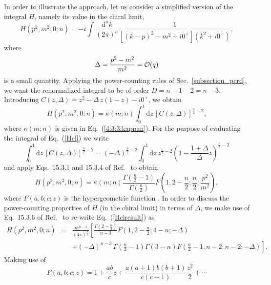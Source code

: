 \documentclass[twoside,12pt]{article}
\begin{document}
   In order to illustrate the approach, let us consider a simplified version
of the integral $H$, namely its value in the chiral limit,
\begin{displaymath}
H(p^2,m^2,0;n)= -i\int \frac{\mbox{d}^n k}{(2\pi)^n}
\frac{1}{[(k-p)^2-m^2+i0^+](k^2+i0^+)},
\end{displaymath}
where
\begin{displaymath}
\Delta=\frac{p^2-m^2}{m^2}={\cal O}(q)
\end{displaymath}
is a small quantity.
   Applying the power-counting rules of Sec.~\ref{subsection_pcrd},
we want the renormalized integral to be of order $D=n-1-2=n-3$.
Introducing
$C(z,\Delta)=z^2-\Delta\, z(1-z)-i0^+$,
we obtain
\begin{equation}
\label{Hcl}
H(p^2,m^2,0;n)=\kappa(m;n)\int_0^1 \mbox{d}z\, [C(z,\Delta)]^{\frac{n}{2}-2},
\end{equation}
where $\kappa(m;n)$ is given in Eq.~(\ref{4:3:3:kappan}).
   For the purpose of evaluating the integral of Eq.\ (\ref{Hcl})
we write
\begin{displaymath}
\int_0^1 \mbox{d}z\, [C(z,\Delta)]^{\frac{n}{2}-2}=
(-\Delta)^{\frac{n}{2}-2}\int_0^1 \mbox{d}z\, z^{\frac{n}{2}-2}
\left(1-\frac{1+\Delta}{\Delta}z\right)^{\frac{n}{2}-2}
\end{displaymath}
and apply Eqs.\ 15.3.1 and 15.3.4 of Ref.\ \cite{Abramowitz} to obtain
\begin{equation}
\label{Hclresult}
H(p^2,m^2,0;n)=\kappa(m;n)\frac{\Gamma\left(\frac{n}{2}-1\right)}{\Gamma
\left(\frac{n}{2}\right)}F\left(1,2-\frac{n}{2};\frac{n}{2};\frac{p^2}{m^2}
\right),
\end{equation}
where $F(a,b;c;z)$ is the hypergeometric function \cite{Abramowitz}.
   In order to discuss the power-counting properties of $H$ (in the chiral
limit) in terms of $\Delta$, we make use of Eq.\ 15.3.6 of Ref.\ \cite{Abramowitz} to re-write
Eq.\ (\ref{Hclresult}) as
\begin{eqnarray}
\label{4:3:4:j0dircalcrewr}
H(p^2,m^2,0;n)&=&\frac{m^{n-4}}{(4\pi)^\frac{n}{2}}\left[
\frac{\Gamma\left(2-\frac{n}{2}\right)}{n-3}
F\left(1,2-\frac{n}{2};4-n;-\Delta\right)\right.\nonumber\\
&&\left.+(-\Delta)^{n-3}\,\Gamma\left(\frac{n}{2}-1\right)
\Gamma(3-n)F\left(\frac{n}{2}-1,n-2;n-2;-\Delta\right)\right].
\end{eqnarray}
   Making use of
\begin{equation}
\label{fexpansion}
F(a,b;c;z)=1+\frac{ab}{c}z+\frac{a(a+1)b(b+1)}{c(c+1)}\frac{z^2}{2}+\cdots
\end{equation}
\end{document}
